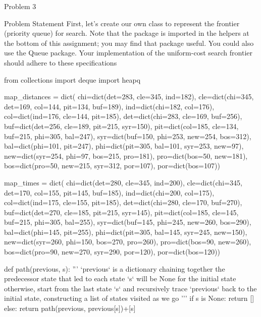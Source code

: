 \begin{problem}{Problem 3}
    \begin{statement}{Problem Statement}
        First, let's create our own  class to represent the frontier (priority queue) for  search. Note that the  package is imported in the helpers at 
        the bottom of this assignment; you may find that package useful. You could also use the Queue package. Your implementation of the uniform-cost search frontier should adhere to these specifications
    \end{statement}

    \begin{highlight}[Solution]
    \begin{code}[Python]
    from collections import deque
    import heapq
    
    map_distances = dict(
        chi=dict(det=283, cle=345, ind=182),
        cle=dict(chi=345, det=169, col=144, pit=134, buf=189),
        ind=dict(chi=182, col=176),
        col=dict(ind=176, cle=144, pit=185),
        det=dict(chi=283, cle=169, buf=256),
        buf=dict(det=256, cle=189, pit=215, syr=150),
        pit=dict(col=185, cle=134, buf=215, phi=305, bal=247),
        syr=dict(buf=150, phi=253, new=254, bos=312),
        bal=dict(phi=101, pit=247),
        phi=dict(pit=305, bal=101, syr=253, new=97),
        new=dict(syr=254, phi=97, bos=215, pro=181),
        pro=dict(bos=50, new=181),
        bos=dict(pro=50, new=215, syr=312, por=107),
        por=dict(bos=107))
    
    
    map_times = dict(
        chi=dict(det=280, cle=345, ind=200),
        cle=dict(chi=345, det=170, col=155, pit=145, buf=185),
        ind=dict(chi=200, col=175),
        col=dict(ind=175, cle=155, pit=185),
        det=dict(chi=280, cle=170, buf=270),
        buf=dict(det=270, cle=185, pit=215, syr=145),
        pit=dict(col=185, cle=145, buf=215, phi=305, bal=255),
        syr=dict(buf=145, phi=245, new=260, bos=290),
        bal=dict(phi=145, pit=255),
        phi=dict(pit=305, bal=145, syr=245, new=150),
        new=dict(syr=260, phi=150, bos=270, pro=260),
        pro=dict(bos=90, new=260),
        bos=dict(pro=90, new=270, syr=290, por=120),
        por=dict(bos=120))
    
    def path(previous, s): 
        '''
        `previous` is a dictionary chaining together the predecessor state that led to each state
        `s` will be None for the initial state
        otherwise, start from the last state `s` and recursively trace `previous` back to the initial state,
        constructing a list of states visited as we go
        '''
        if s is None:
            return []
        else:
            return path(previous, previous[s])+[s]
    

\end{code}
\end{highlight}
\end{problem}

